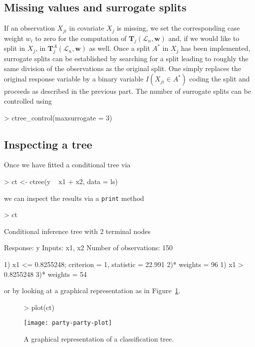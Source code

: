 \documentclass{Z}
\newcommand{\LS}{\mathcal{L}_n}
\newcommand{\T}{\mathbf{T}}
\newcommand{\w}{\mathbf{w}}
\begin{document}
\subsection{Missing values and surrogate splits}

If an observation $X_{ji}$ in covariate $X_j$ is missing, we set the
corresponding case weight $w_i$ to zero for the computation of $\T_j(\LS, \w)$
and, if we would like to split in $X_j$, in $\T_{j}^A(\LS, \w)$ as well.
Once a split $A^*$ in $X_j$ has been implemented, surrogate splits can be 
established by
searching for a split leading to roughly the same division of the
observations as the original split. One simply replaces the original
response variable by a binary variable $I(X_{ji} \in A^*)$ coding the
split and proceeds as described in the previous part. The number of
surrogate splits can be controlled using
\begin{Schunk}
\begin{Sinput}
> ctree_control(maxsurrogate = 3)
\end{Sinput}
\end{Schunk}

\subsection{Inspecting a tree}

Once we have fitted a conditional tree via
\begin{Schunk}
\begin{Sinput}
> ct <- ctree(y ~ x1 + x2, data = ls)
\end{Sinput}
\end{Schunk}
we can inspect the results via a \texttt{print} method
\begin{Schunk}
\begin{Sinput}
> ct
\end{Sinput}
\begin{Soutput}
	 Conditional inference tree with 2 terminal nodes

Response:  y 
Inputs:  x1, x2 
Number of observations:  150 

1) x1 <= 0.8255248; criterion = 1, statistic = 22.991
  2)*  weights = 96 
1) x1 > 0.8255248
  3)*  weights = 54 
\end{Soutput}
\end{Schunk}
or by looking at a graphical representation as in Figure~\ref{party-plot1}.

\begin{figure}[h]
\begin{center}
\begin{Schunk}
\begin{Sinput}
> plot(ct)
\end{Sinput}
\end{Schunk}
\texttt{[image: party-party-plot]}
\caption{A graphical representation of a classification tree.
\label{party-plot1}}
\end{center}
\end{figure}
\end{document}
